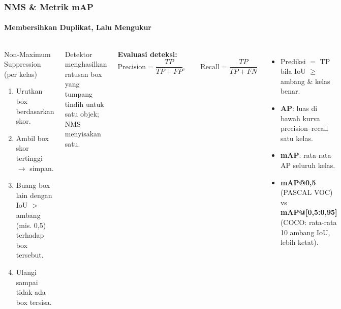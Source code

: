 \documentclass[t,aspectratio=169,xcolor=dvipsnames]{beamer}
\begin{document}
\begin{frame}
    \frametitle{NMS \& Metrik mAP}
    \framesubtitle{Membersihkan Duplikat, Lalu Mengukur}
    \footnotesize

    \begin{columns}[T]
        \begin{block}{Non-Maximum Suppression (per kelas)}
            \begin{enumerate}
                \item Urutkan box berdasarkan skor.
                \item Ambil box skor tertinggi $\to$ simpan.
                \item Buang box lain dengan IoU $>$ ambang (mis. 0,5) terhadap box tersebut.
                \item Ulangi sampai tidak ada box tersisa.
            \end{enumerate}
        \end{block}
        {\scriptsize\color{dlMute} Detektor menghasilkan ratusan box yang tumpang tindih untuk satu objek; NMS menyisakan satu.}

        \textbf{Evaluasi deteksi:}
        $$\text{Precision}=\frac{TP}{TP+FP},\qquad \text{Recall}=\frac{TP}{TP+FN}$$
        \begin{itemize}
            \item Prediksi $=$ TP bila IoU $\ge$ ambang \& kelas benar.
            \item \textbf{AP}: luas di bawah kurva precision--recall satu kelas.
            \item \textbf{mAP}: rata-rata AP seluruh kelas.
            \item \textbf{mAP@0,5} (PASCAL VOC) vs \textbf{mAP@[0,5:0,95]} (COCO: rata-rata 10 ambang IoU, lebih ketat).
        \end{itemize}
    \end{columns}
\end{frame}
\end{document}
